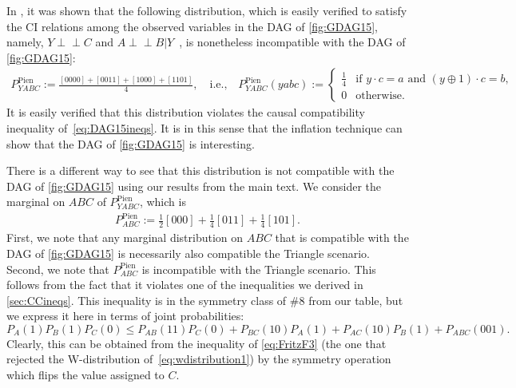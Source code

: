 \documentclass[aps,english,superscriptaddress,onecolumn,twoside,longbibliography,pra,floatfix,fleqn,nofootinbib]{revtex4-1}%
\theoremstyle{definition}
\newcommand{\indep}{\perp\!\!\!\!\perp} %
\begin{document}
In \citet{pianaar2016interesting}, it was shown that the following distribution, which is easily verified to satisfy the CI relations among the observed variables in the DAG of \cref{fig:GDAG15}, namely, 
$Y\indep C$ and $A\indep B | Y$~\cite{pusey2014gdag}, is nonetheless incompatible with the DAG of \cref{fig:GDAG15}:
\begin{align}\label{eq:pienaardistro}
    P^{\text{Pien}}_{Y\! A B C}:=\frac{[0000]+[0011]+[1000]+[1101]}{4},\quad\text{i.e.,}\quad P^{\text{Pien}}_{Y\! A B C}(y a b c):=\begin{cases}\tfrac{1}{4}&\text{if }  y\cdot c = a \text{ and }  (y \oplus 1)\cdot c = b, \\ 0&\text{otherwise}.\end{cases}
\end{align}
It is easily verified that this distribution violates the causal compatibility inequality of~\cref{eq:DAG15ineqs}.  It is in this sense that the inflation technique can show that the DAG of \cref{fig:GDAG15} is interesting. 

There is a different way to see that this distribution is not compatible with the DAG of \cref{fig:GDAG15} using our results from the main text.  We consider the marginal on $ABC$ of $P^{\text{Pien}}_{Y\! A B C}$, which is
\begin{align}\label{eq:pienaardistroABC}
    P^{\text{Pien}}_{ A B C}:=\frac{1}{2}[000]+\frac{1}{4}[011]+\frac{1}{4}[101].
\end{align}
First, we note that any marginal distribution on $ABC$ that is compatible with the DAG of \cref{fig:GDAG15} is necessarily also compatible the Triangle scenario.  Second, we note that $P^{\text{Pien}}_{A B C}$ is incompatible with the Triangle scenario.  This follows from the fact that it violates one of the inequalities we derived in \cref{sec:CCineqs}.  This inequality is in the symmetry class of \#8 from our table, but we express it here in terms of joint probabilities:
\begin{equation}
	P_{A}(1) P_{B}(1) P_{C}(0) \leq P_{AB}(11) P_C(0) + P_{BC}(10) P_A(1) + P_{AC}(10) P_B(1) + P_{ABC}(001).
\end{equation}
Clearly, this can be obtained from the inequality of \cref{eq:FritzF3} (the one that rejected the W-distribution of~\cref{eq:wdistribution1}) by the symmetry operation which flips the value assigned to $C$.  
\end{document}

